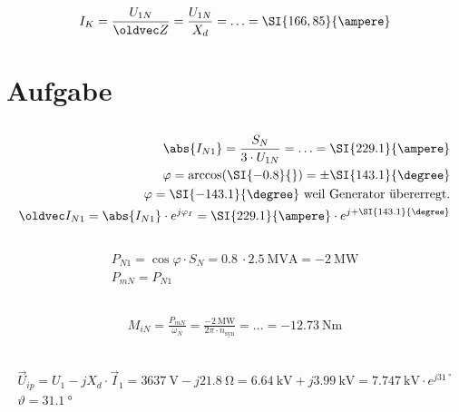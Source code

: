 \documentclass[10pt,a4paper]{article}
\let\newvec = \newvec
\let\newvec = \oldvec
\begin{document}
\subsection{}
\begin{align*}
I_K = \frac{U_{1N}}{\newvec Z} = \frac{U_{1N}}{X_d} = \ldots = \SI{166,85}{\ampere}
\end{align*}

\section{Aufgabe}
\subsection{}
\begin{align*}
\abs{I_{N1}} = \frac{S_N}{3 \cdot U_{1N}} = \ldots = \SI{229.1}{\ampere}\\
\varphi = \arccos(\SI{-0.8}{}) = \pm \SI{143.1}{\degree}\\
\varphi = \SI{-143.1}{\degree} \text{ weil Generator übererregt.}\\
\newvec I_{N1} = \abs{I_{N1}} \cdot e^{j\varphi_I} = \SI{229.1}{\ampere} \cdot e^{j + \SI{143.1}{\degree}}
\end{align*}

\subsection{}
\begin{align*}
P_{N1} = \cos\varphi \cdot S_N = \SI{0.8}{} \cdot \SI{2.5}{\mega\volt\ampere} = \SI{-2}{\mega\watt}\\
P_{mN} = P_{N1}
\end{align*}

\subsection{}
\begin{align*}
M_{iN} = \frac{P_{mN}}{\omega_N} = \frac{\SI{-2}{\mega\watt}}{2\pi \cdot n_\text{syn}} = \ldots = \SI{-12.73}{\newton\meter}
\end{align*}

\subsection{}
\begin{align*}
\vec U_{ip} = U_{1} - jX_d \cdot \vec I_1 = \SI{3637}{\volt} - j\SI{21.8}{\ohm} = \SI{6.64}{\kilo\volt} + j\SI{3.99}{\kilo\volt} = \SI{7.747}{\kilo\volt} \cdot e^{j \SI{31}{\degree}}\\
\vartheta = \SI{31.1}{\degree}
\end{align*}
\end{document}
